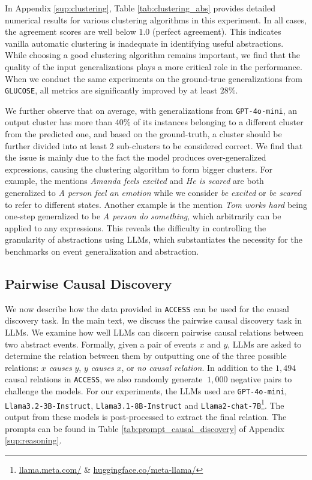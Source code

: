 In Appendix \ref{sup:clustering}, Table \ref{tab:clustering_abs} provides detailed numerical results for various clustering algorithms in this experiment. In all cases, the agreement scores are well below $1.0$ (perfect agreement). This indicates  vanilla automatic clustering is inadequate in identifying useful abstractions. While choosing a good clustering algorithm remains important, we find that the quality of the input generalizations plays a more critical role in the performance. When we conduct the same experiments on the ground-true generalizations from \texttt{GLUCOSE}, all metrics are significantly improved by at least $28\%$. 

We further observe that on average, with generalizations from \texttt{GPT-4o-mini}, an output cluster has more than $40\%$ of its instances belonging to a different cluster from the predicted one, and based on the ground-truth, a cluster should be further divided into at least $2$ sub-clusters to be considered correct. We find that the issue is mainly due to the fact the model produces over-generalized expressions, causing the clustering algorithm to form bigger clusters. For example, the mentions \textit{Amanda feels excited} and \textit{He is scared} are both generalized to \textit{A person feel an emotion} while we consider \textit{be excited} or \textit{be scared} to refer to different states. Another example is the mention \textit{Tom works hard} being one-step generalized to be \textit{A person do something}, which arbitrarily can be applied to any expressions. This reveals the difficulty in controlling the granularity of abstractions using LLMs, which substantiates the necessity for the benchmarks on event generalization and abstraction. 


\subsection{Pairwise Causal Discovery}\label{sec:CAUSAL}

We now describe how the data provided in \texttt{ACCESS} can be used for the causal discovery task. In the main text, we discuss the pairwise causal discovery task in LLMs. We examine how well LLMs can discern pairwise causal relations between two abstract events. Formally, given a pair of events $x$ and $y$, LLMs are asked to determine the relation between them by outputting one of the three possible relations: $x$ \textit{causes} $y$, $y$ \textit{causes} $x$, or \textit{no causal relation}. In addition to the $1,494$ causal relations in \texttt{ACCESS}, we also randomly generate $~1,000$ negative pairs to challenge the models. For our experiments, the LLMs used are \texttt{GPT-4o-mini}, \texttt{Llama3.2-3B-Instruct}, \texttt{Llama3.1-8B-Instruct} and \texttt{Llama2-chat-7B}\footnote{\url{llama.meta.com/} \& \url{huggingface.co/meta-llama/}}. The output from these models is post-processed to extract the final relation. The prompts can be found in Table \ref{tab:prompt_causal_discovery} of Appendix \ref{sup:reasoning}. 
 
